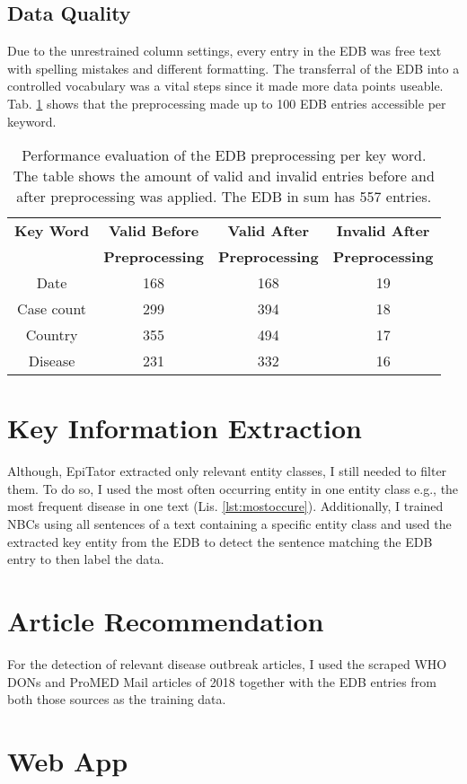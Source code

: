 \subsection{Data Quality}
Due to the unrestrained column settings, every entry in the EDB was free text with spelling mistakes and different formatting. The transferral of the EDB into a controlled vocabulary was a vital steps since it made more data points useable. Tab. \ref{table:preprocessing performance} shows that the preprocessing made up to 100 EDB entries accessible per keyword.

\begin{table}
  \centering
  \caption{Performance evaluation of the EDB preprocessing per key word. The table shows the amount of valid and invalid entries before and after preprocessing was applied. The EDB in sum has 557 entries.  }
  \begin{tabular}{@{}cccc@{}}
    \toprule
    \textbf{Key Word} & \textbf{Valid Before} & \textbf{Valid After} & \textbf{Invalid After} \\
    & \textbf{Preprocessing} & \textbf{Preprocessing} & \textbf{Preprocessing} \\
    \midrule
    Date & 168 & 168 &  19 \\
    Case count & 299 & 394 &  18 \\
    Country & 355 & 494 &  17 \\
    Disease & 231 & 332 & 16 \\
    \bottomrule
  \end{tabular}
  \label{table:preprocessing performance}
\end{table}

\section{Key Information Extraction}
Although, EpiTator extracted only relevant entity classes, I still needed to filter them.
To do so, I used the most often occurring entity in one entity class e.g., the most frequent disease in one text (Lis. \ref{lst:mostoccure}).
Additionally, I trained NBCs using all sentences of a text containing a specific entity class and used the extracted key entity from the EDB to detect the sentence matching the EDB entry to then label the data.

\section{Article Recommendation}
For the detection of relevant disease outbreak articles, I used the scraped WHO DONs and ProMED Mail articles of 2018 together with the EDB entries from both those sources as the training data.

\section{Web App}
